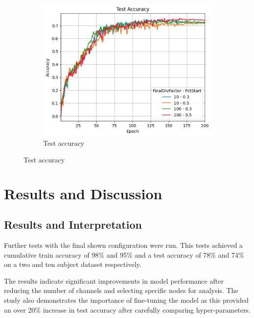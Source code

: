 \documentclass[11pt, a4paper, oneside]{assets/tex/thesis} %
\begin{document}
{\begin{itemize}
\begin{figure}[h]
\begin{subfigure}[b]{0.3\textwidth}
        \end{subfigure}%
        \hfill
        \begin{subfigure}[b]{0.3\textwidth}
            \centering
            \includegraphics[width=\textwidth]{assets/img/onecycle_tests_test_acc.png}
            \caption{Test accuracy}
            \label{fig:onecycle_tests_test_acc}
        \end{subfigure}%
    \end{figure}

    
\end{itemize}


\chapter{Results and Discussion}
\label{Ch4}

\section{Results and Interpretation}
Further tests with the final shown configuration were run. This tests achieved a cumulative train accuracy of 98\% and 95\% and a test accuracy of 78\% and 74\% on a two and ten subject dataset respectively.

The results indicate significant improvements in model performance after reducing the number of channels and selecting specific nodes for analysis. The study also demonstrates the importance of fine-tuning the model as this provided an over 20\% increase in test accuracy after carefully comparing hyper-parameters.

}
\end{document}
